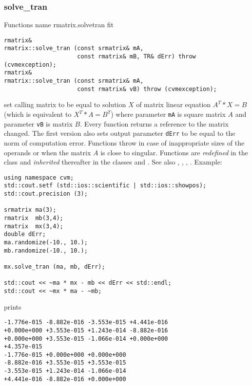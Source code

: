 \subsubsection{solve\_tran}
Functions%
\pdfdest name {rmatrix.solvetran} fit
\begin{verbatim}
rmatrix&
rmatrix::solve_tran (const srmatrix& mA,
                     const rmatrix& mB, TR& dErr) throw (cvmexception);
rmatrix&
rmatrix::solve_tran (const srmatrix& mA,
                     const rmatrix& vB) throw (cvmexception);
\end{verbatim}
set calling matrix to be equal to  solution $X$ of 
matrix linear equation
$A^T*X=B$ (which is equivalent to $X^T*A=B^T$)
where parameter \verb"mA" is square matrix $A$
and parameter \verb"vB" is matrix $B$.
Every function returns a reference to the matrix changed.
The first version also sets  output parameter \verb"dErr" to be equal
to the norm of computation error.
Functions throw 
in case of inappropriate sizes
of the operands or when the matrix $A$ is close to singular.
Functions are \emph{redefined} in  the class
 and
\emph{inherited} thereafter in the classes
 and
.
See also
,
,
,
.
Example:
\begin{Verbatim}
using namespace cvm;
std::cout.setf (std::ios::scientific | std::ios::showpos); 
std::cout.precision (3);

srmatrix ma(3);
rmatrix  mb(3,4);
rmatrix  mx(3,4);
double dErr;
ma.randomize(-10., 10.);
mb.randomize(-10., 10.);

mx.solve_tran (ma, mb, dErr);

std::cout << ~ma * mx - mb << dErr << std::endl;
std::cout << ~mx * ma - ~mb;
\end{Verbatim}
prints
\begin{Verbatim}
-1.776e-015 -8.882e-016 -3.553e-015 +4.441e-016
+0.000e+000 +3.553e-015 +1.243e-014 -8.882e-016
+0.000e+000 +3.553e-015 -1.066e-014 +0.000e+000
+4.357e-015
-1.776e-015 +0.000e+000 +0.000e+000
-8.882e-016 +3.553e-015 +3.553e-015
-3.553e-015 +1.243e-014 -1.066e-014
+4.441e-016 -8.882e-016 +0.000e+000
\end{Verbatim}
\newpage






